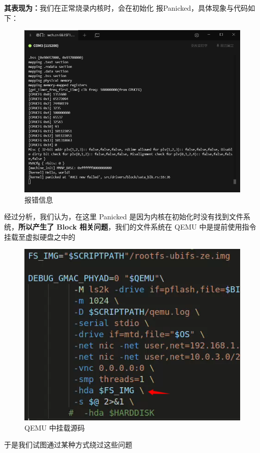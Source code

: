 \textbf{其表现为：}我们在正常烧录内核时，会在初始化  报Panicked，具体现象与代码如下：

\begin{figure}[htbp]
	\centering
	\includegraphics[width=0.5\linewidth]{figs/bug.png}
	\caption{报错信息}
	\label{information of bug}
\end{figure}

经过分析，我们认为，在这里 Panicked 是因为内核在初始化时没有找到文件系统，\textbf{所以产生了 Block 相关问题}，我们的文件系统在 QEMU 中是提前使用指令挂载至虚拟硬盘之中的

\begin{figure}[htbp]
	\centering
	\includegraphics[width=0.5\linewidth]{figs/hda.png}
	\caption{QEMU 中挂载源码}
	\label{information of bug}
\end{figure}

于是我们试图通过某种方式绕过这些问题

